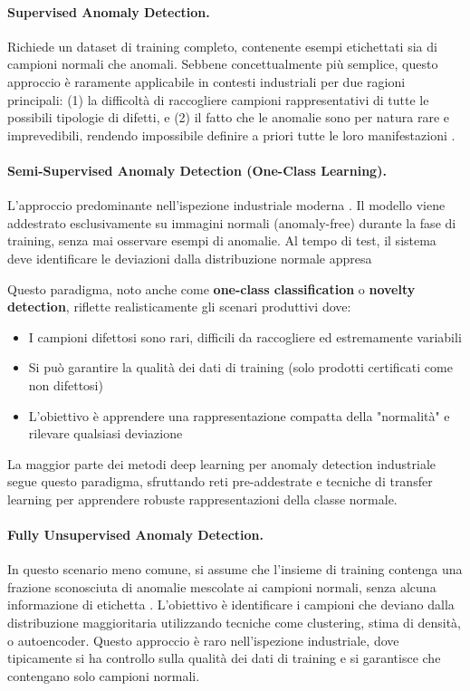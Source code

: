 \paragraph{Supervised Anomaly Detection.}
Richiede un dataset di training completo, contenente esempi etichettati sia di campioni normali che anomali. Sebbene concettualmente più semplice, questo approccio è raramente applicabile in contesti industriali per due ragioni principali: (1) la difficoltà di raccogliere campioni rappresentativi di tutte le possibili tipologie di difetti, e (2) il fatto che le anomalie sono per natura rare e imprevedibili, rendendo impossibile definire a priori tutte le loro manifestazioni \cite{bergmann2020uninformed}.

\paragraph{Semi-Supervised Anomaly Detection (One-Class Learning).}
L'ap\-proc\-cio predominante nell'ispezione industriale moderna \cite{bergmann2019mvtec, roth2022towards, defard2021padim}. Il mo\-del\-lo viene addestrato esclusivamente su immagini normali (anomaly-free) durante la fase di training, senza mai osservare esempi di anomalie. Al tempo di test, il sistema deve identificare le deviazioni dalla distribuzione normale appresa

Questo paradigma, noto anche come \textbf{one-class classification} \cite{tax2004support} o \textbf{no\-vel\-ty detection}, riflette realisticamente gli scenari produttivi dove:

\begin{itemize}
\item I campioni difettosi sono rari, difficili da raccogliere ed estremamente variabili
\item Si può garantire la qualità dei dati di training (solo prodotti certificati come non difettosi)
\item L'obiettivo è apprendere una rappresentazione compatta della "normalità" e rilevare qualsiasi deviazione
\end{itemize}

La maggior parte dei metodi deep learning per anomaly detection industriale segue questo paradigma, sfruttando reti pre-addestrate e tecniche di transfer learning per apprendere robuste rappresentazioni della classe normale.

\paragraph{Fully Unsupervised Anomaly Detection.}
In questo scenario meno comune, si assume che l'insieme di training contenga una frazione sconosciuta di anomalie mescolate ai campioni normali, senza alcuna informazione di etichetta \cite{chandola2009anomaly}. L'obiettivo è identificare i campioni che deviano dalla distribuzione maggioritaria utilizzando tecniche come clustering, stima di densità, o autoencoder. Questo approccio è raro nell'ispezione industriale, dove tipicamente si ha controllo sulla qualità dei dati di training e si garantisce che contengano solo campioni normali.

